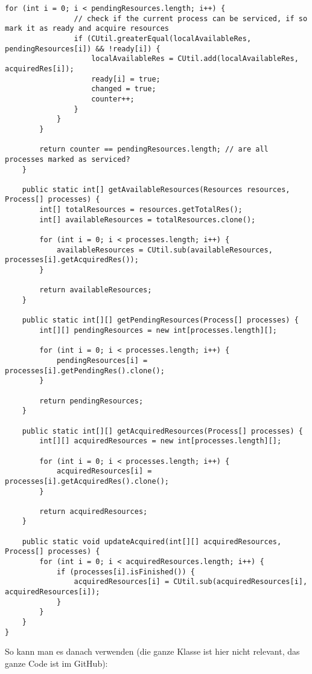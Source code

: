 \begin{enumerate}
\begin{enumerate}
\begin{lstlisting}[style=java]
            for (int i = 0; i < pendingResources.length; i++) {
                // check if the current process can be serviced, if so mark it as ready and acquire resources
                if (CUtil.greaterEqual(localAvailableRes, pendingResources[i]) && !ready[i]) {
                    localAvailableRes = CUtil.add(localAvailableRes, acquiredRes[i]);
                    ready[i] = true;
                    changed = true;
                    counter++;
                }
            }
        }

        return counter == pendingResources.length; // are all processes marked as serviced?
    }

    public static int[] getAvailableResources(Resources resources, Process[] processes) {
        int[] totalResources = resources.getTotalRes();
        int[] availableResources = totalResources.clone();

        for (int i = 0; i < processes.length; i++) {
            availableResources = CUtil.sub(availableResources, processes[i].getAcquiredRes());
        }

        return availableResources;
    }

    public static int[][] getPendingResources(Process[] processes) {
        int[][] pendingResources = new int[processes.length][];

        for (int i = 0; i < processes.length; i++) {
            pendingResources[i] = processes[i].getPendingRes().clone();
        }

        return pendingResources;
    }

    public static int[][] getAcquiredResources(Process[] processes) {
        int[][] acquiredResources = new int[processes.length][];

        for (int i = 0; i < processes.length; i++) {
            acquiredResources[i] = processes[i].getAcquiredRes().clone();
        }

        return acquiredResources;
    }

    public static void updateAcquired(int[][] acquiredResources, Process[] processes) {
        for (int i = 0; i < acquiredResources.length; i++) {
            if (processes[i].isFinished()) {
                acquiredResources[i] = CUtil.sub(acquiredResources[i], acquiredResources[i]);
            }
        }
    }
}

\end{lstlisting}

So kann man es danach verwenden (die ganze Klasse ist hier nicht relevant, das ganze Code ist im GitHub):


\end{enumerate}
\end{enumerate}

